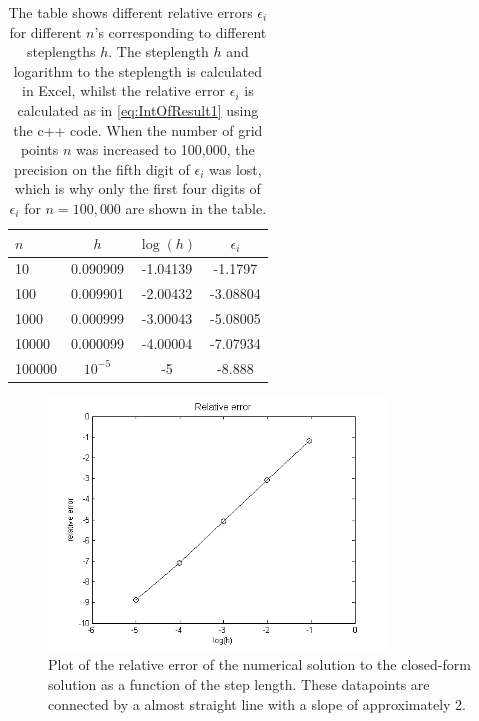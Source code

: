 \begin{table}[H]
	\centering
  \begin{tabular}{| l | c | c | c |}
    \hline
    $n$		& $h$ 	& $\log(h)$ & $\epsilon_i$ \\ \hline
    10 		& 0.090909 	& -1.04139 & -1.1797 
    \\ \hline
    100 	& 0.009901 	& -2.00432 & -3.08804 
    \\ \hline
    1000 	& 0.000999 	& -3.00043 & -5.08005 
    \\ \hline
	10000 	& 0.000099 	& -4.00004 & -7.07934 
    \\ \hline
    100000 	& $10^{-5}$	& -5	   & -8.888 
    \\ \hline
  \end{tabular}
  \caption{The table shows different relative errors $\epsilon_i$ for different $n$'s corresponding to different steplengths $h$. The steplength $h$ and logarithm to the steplength is calculated in Excel, whilst the relative error $\epsilon_i$ is calculated as in \eqref{eq:IntOfResult1} using the c++ code. When the number of grid points $n$ was increased to 100,000, the precision on the fifth digit of $\epsilon_i$ was lost, which is why only the first four digits of $\epsilon_i$ for $n = 100,000$ are shown in the table.}
  \label{tab:IntOfResult1}
\end{table}

\begin{figure}[H]
	\centering
	\includegraphics[width=0.8\textwidth]{Figures/relativeerror5.png}
	\caption{Plot of the relative error of the numerical solution to the closed-form solution as a function of the step length. These datapoints are connected by a almost straight line with a slope of approximately 2.}
	\label{fig:IntOfResult2}
\end{figure}
